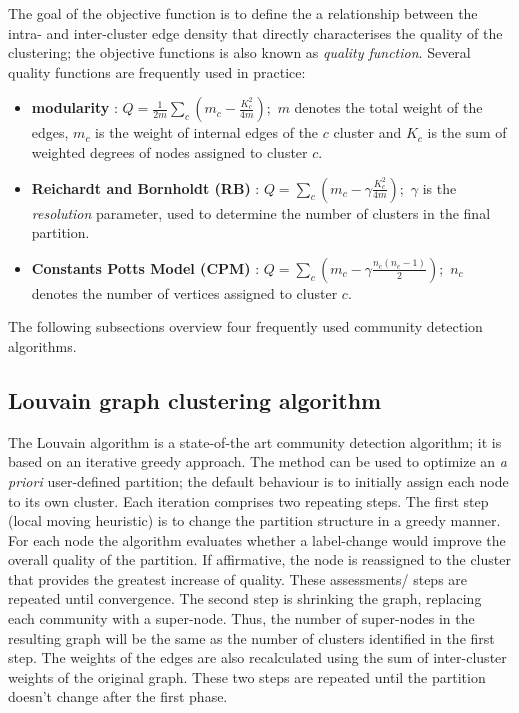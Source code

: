The goal of the objective function is to define the a relationship between the intra- and inter-cluster edge density that directly characterises the quality of the clustering; the objective functions is also known as \textit{quality function}. Several quality functions are frequently used in practice:
\begin{itemize}
    \item \textbf{modularity} \cite{Newman2004}: $\displaystyle Q = \frac{1}{2m} \sum_c \left(m_c - \frac{K_c^2}{4m}\right);$ $m$ denotes the total weight of the edges, $m_c$ is the weight of internal edges of the $c$ cluster and $K_c$ is the sum of weighted degrees of nodes assigned to cluster $c$.
    
    \item \textbf{Reichardt and Bornholdt (RB)} \cite{Reichardt2006}: $Q = \sum_c \left( m_c - \gamma \frac{K_c^2}{4m}\right);$ $\gamma$ is the \textit{resolution} parameter, used to determine the number of clusters in the final partition.
    \item \textbf{Constants Potts Model (CPM)} \cite{Traag2011}: $Q = \sum_c \left( m_c - \gamma \frac{n_c (n_c - 1)}{2}\right);$  $n_c$ denotes the number of vertices assigned to cluster $c$.
\end{itemize}

The following subsections overview four frequently used community detection algorithms.

\subsection{Louvain graph clustering algorithm}
The Louvain algorithm \cite{Blondel2008b} is a state-of-the art community detection algorithm; it is based on an iterative greedy approach. The method can be used to optimize an \textit{a priori} user-defined partition; the default behaviour is to initially assign each node to its own cluster.
Each iteration comprises two repeating steps. The first step (local moving heuristic) is to change the partition structure in a greedy manner. For each node the algorithm evaluates whether a label-change would improve the overall quality of the partition. If affirmative, the node is reassigned to the cluster that provides the greatest increase of quality. These assessments/ steps are repeated until convergence. The second step is shrinking the graph, replacing each community with a super-node. Thus, the number of super-nodes in the resulting graph will be the same as the number of clusters identified in the first step. The weights of the edges are also recalculated using the sum of inter-cluster weights of the original graph.
These two steps are repeated until the partition doesn't change after the first phase.

